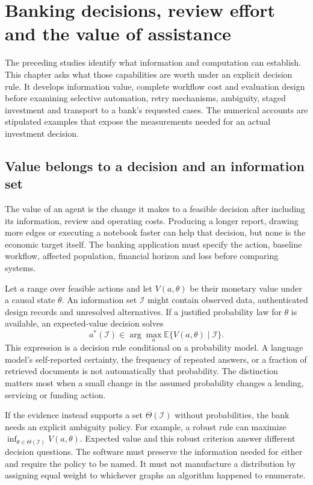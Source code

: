 \chapter{Banking decisions, review effort and the value of assistance}
\label{la:economics}

The preceding studies identify what information and computation can establish. This chapter asks what those capabilities are worth under an explicit decision rule. It develops information value, complete workflow cost and evaluation design before examining selective automation, retry mechanisms, ambiguity, staged investment and transport to a bank's requested cases. The numerical accounts are stipulated examples that expose the measurements needed for an actual investment decision.

\section{Value belongs to a decision and an information set}

The value of an agent is the change it makes to a feasible decision after
including its information, review and operating costs. Producing a longer
report, drawing more edges or executing a notebook faster can help that
decision, but none is the economic target itself. The banking application must
specify the action, baseline workflow, affected population, financial horizon
and loss before comparing systems.

Let $a$ range over feasible actions and let $V(a,\theta)$ be their monetary
value under a causal state $\theta$. An information set $\mathcal I$ might
contain observed data, authenticated design records and unresolved alternatives.
If a justified probability law for $\theta$ is available, an expected-value
decision solves
\[
 a^*(\mathcal I)\in\arg\max_a
       \mathbb E\{V(a,\theta)\mid\mathcal I\}.
\]
This expression is a decision rule conditional on a probability model. A
language model's self-reported certainty, the frequency of repeated answers,
or a fraction of retrieved documents is not automatically that probability.
The distinction matters most when a small change in the assumed probability
changes a lending, servicing or funding action.

If the evidence instead supports a set $\Theta(\mathcal I)$ without probabilities,
the bank needs an explicit ambiguity policy. For example, a robust rule can
maximize $\inf_{\theta\in\Theta(\mathcal I)}V(a,\theta)$. Expected value and this
robust criterion answer different decision questions. The software must
preserve the information needed for either and require the policy to be named.
It must not manufacture a distribution by assigning equal weight to whichever
graphs an algorithm happened to enumerate.

